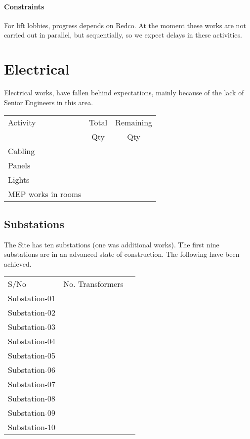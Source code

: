 \paragraph{Constraints}  For lift lobbies, progress depends on Redco. At the moment these works are not carried out in parallel, but sequentially, so we expect delays in these activities.

\section{Electrical}

Electrical works, have fallen behind expectations, mainly because of the lack of Senior Engineers in this area. 


{\smaller
\begin{longtable}{l c c}
\toprule
Activity  & Total & Remaining \\ 
          & Qty & Qty\\ 
\midrule
Cabling &  &\\

Panels & &\\

Lights &  &\\

MEP works in rooms & &\\
\bottomrule
\end{longtable}
}

\subsection{Substations}

The Site has ten substations (one was additional works). The first nine substations are in an advanced state of construction. The following have been achieved.

\begin{longtable}{lll}
S/No            &No. Transformers &   \\
Substation-01   &  &\\
Substation-02   &  &\\
Substation-03   &  &\\
Substation-04   &  &\\
Substation-05   &  &\\
Substation-06   &  &\\
Substation-07   &  &\\
Substation-08   &  &\\
Substation-09   &  & \\
Substation-10   &  &\\
\end{longtable}


